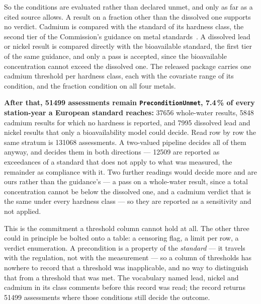 So the conditions are evaluated rather than declared unmet, and only as far as a
cited source allows. A result on a
fraction other than the dissolved one supports no verdict. Cadmium is compared
with the standard of its hardness class, the second tier of the Commission's
guidance on metal standards~\cite{eu2019gd38}. A dissolved lead or nickel result
is compared directly with the bioavailable standard, the first tier of the same
guidance, and only a pass is accepted, since the bioavailable concentration
cannot exceed the dissolved one. The released package carries one cadmium
threshold per hardness class, each with the covariate range of its condition, and
the fraction condition on all four metals.

\textbf{After that, \num{51499} assessments remain \texttt{PreconditionUnmet},
\num{7.4}\,\% of every station-year a European standard reaches:} \num{37656}
whole-water results, \num{5848} cadmium results for which no hardness is
reported, and \num{7995} dissolved lead and nickel results that only a
bioavailability model could decide. Read row by row the same stratum is
\num{131068} assessments. A two-valued pipeline decides all of them anyway, and
decides them in both directions --- \num{12509} are reported as exceedances of a
standard that does not apply to what was measured, the remainder as compliance
with it. Two further readings would decide more and are ours rather than the
guidance's --- a pass on a whole-water result, since a total concentration cannot
be below the dissolved one, and a cadmium verdict that is the same under every
hardness class --- so they are reported as a sensitivity and not
applied.

This is the commitment a threshold column cannot hold at all. The other three
could in principle be bolted onto a table: a censoring flag, a limit per row, a
verdict enumeration. A precondition is a property of the \emph{standard} --- it
travels with the regulation, not with the measurement --- so a column of
thresholds has nowhere to record that a threshold was inapplicable, and no way to
distinguish that from a threshold that was met. The vocabulary named lead, nickel
and cadmium in its class comments before this record was read; the record returns
\num{51499} assessments where those conditions still decide the outcome.

